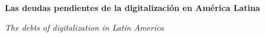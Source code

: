 \documentclass{article}
\renewcommand{\normalsize}{\fontsize{10pt}{13pt}\selectfont}
\newcommand{\articulotipo}{}
\newcommand{\articulotitulo}{}
\newcommand{\articulotitulotrans}{}
\newcommand{\articuloautores}{}
\newcommand{\articulodoi}{}
\newcommand{\articuloidiomaxml}{es}
\newcommand{\articulorevista}{}
\newcommand{\articuloissne}{}
\newcommand{\articulovolumen}{}
\newcommand{\articulonumero}{}
\newcommand{\articulofecha}{}
\newcommand{\articulopagina}{0}
\begin{document}

\renewcommand{\articuloidiomaxml}{es}
\renewcommand{\articulotitulo}{Las deudas pendientes de la digitalización en América Latina}
\renewcommand{\articuloautores}{Las Gentes}
\renewcommand{\articulodoi}{10.24215/18522971e133}
\renewcommand{\articulotipo}{EDITORIAL}
\renewcommand{\articulorevista}{Revista Revistas}
\renewcommand{\articuloissne}{1515-1573}
\renewcommand{\articulovolumen}{1}
\renewcommand{\articulonumero}{1}
\renewcommand{\articulofecha}{ 2026}
\renewcommand{\articulopagina}{0}

\setcounter{page}{0}
\thispagestyle{firstpage}

\noindent\begin{minipage}[t]{\dimexpr\textwidth+\marginparsep+\marginparwidth\relax}%
{\sffamily\bfseries\Large\articulotitulo\par}%
\end{minipage}\par
\vspace{3mm}%
\renewcommand{\articulotitulotrans}{The debts of digitalization in Latin America}
\noindent\begin{minipage}[t]{\dimexpr\textwidth+\marginparsep+\marginparwidth\relax}%
{\sffamily\itshape\normalsize\articulotitulotrans\par}%
\end{minipage}\par
\vspace{4mm}%
\end{document}
